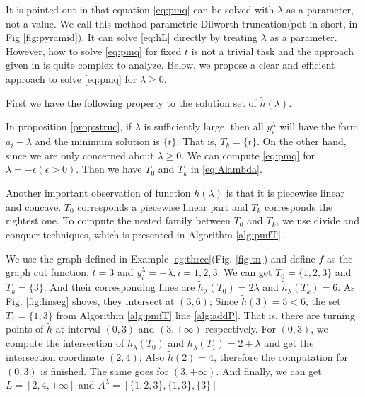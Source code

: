 \documentclass{article}
\begin{document}
It is pointed out in \cite{RN4} that equation \eqref{eq:pmq} can be solved with $\lambda$ as a parameter, not a value. We call this method parametric Dilworth truncation(pdt in short, in Fig \ref{fig:pyramid}). It can solve \eqref{eq:hL} directly by treating $\lambda$ as a parameter. However, how to solve \eqref{eq:pmq} for fixed $t$ is not a trivial task and the approach given in \cite{RN4} is quite complex to analyze. Below, we propose a clear and efficient approach to solve \eqref{eq:pmq} for $\lambda\geq 0$. 

First we have the following property to the solution set of $\tilde{h}(\lambda) $.


In proposition \ref{prop:struc}, if $\lambda$ is sufficiently large, then all $y_i^{\lambda}$ will have the form $a_i -  \lambda$ and the minimum solution is $\{t\}$. That is, $T_k = \{t\}$. On the other hand, since we are only concerned about $\lambda \geq 0$. We can compute \eqref{eq:pmq} for $\lambda = -\epsilon (\epsilon > 0)$. Then we have $T_0$ and $T_k$ in \eqref{eq:Alambda}.

Another important observation of function $\tilde{h}(\lambda)$ is that it is piecewise linear and concave. $T_0$ corresponds a piecewise linear part and $T_k$ corresponds the rightest one.  To compute the nested family between $T_0$ and $T_k$, we use divide and conquer techniques, which is presented in Algorithm \ref{alg:pmfT}.


\begin{example}
We use the graph defined in Example \ref{eg:three}(Fig. \ref{fig:tn}) and define $f$ as the graph cut function, $t=3$ and $y^{\lambda}_i = -\lambda, i=1,2,3$. 
We can get $T_0 = \{1,2,3\} $ and $T_k = \{3\}$. And their corresponding lines are $\tilde{h}_{\lambda}(T_0) =2\lambda$ and $\tilde{h}_{\lambda}(T_k)=6$. As Fig. \ref{fig:linseg} shows, they intersect at $(3, 6)$; Since $\tilde{h}(3)=5<6$, the set $T_1=\{1,3\}$ from Algorithm \ref{alg:pmfT} line \ref{alg:addP}. That is, there are turning points of $\tilde{h}$ at interval $(0, 3)$ and $(3, +\infty)$ respectively. For $(0,3)$, we compute the intersection of $\tilde{h}_{\lambda}(T_0)$ and $\tilde{h}_{\lambda}(T_1)=2+\lambda$ and get the intersection coordinate $(2,4)$; Also $\tilde{h}(2)=4$, therefore  the computation for $(0,3)$ is finished. The same goes for $(3, +\infty)$. And finally, we can get $L=[2,4, +\infty]$ and $A^{\lambda} = [\{1,2,3\}, \{1,3\},\{3\}]$	
\end{example}
\end{document}
